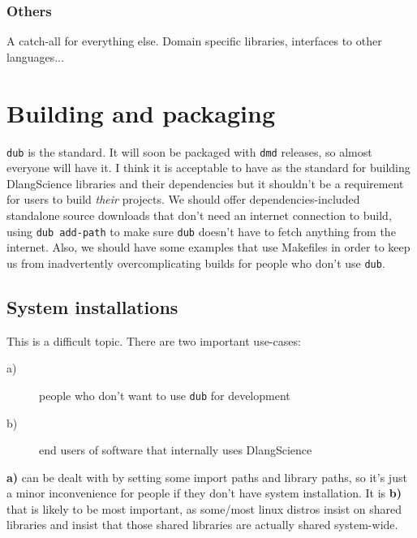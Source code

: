 \documentclass[10pt,a5paper,DIV=13]{scrartcl}
\begin{document}
\subsubsection*{Others}
A catch-all for everything else. Domain specific libraries, interfaces to other languages...

\section{Building and packaging}
\texttt{dub} is the standard. It will soon be packaged with \texttt{dmd} releases, so almost everyone will have it. I think it is acceptable to have as the standard for building DlangScience libraries and their dependencies but it shouldn't be a requirement for users to build \emph{their} projects. We should offer dependencies-included standalone source downloads that don't need an internet connection to build, using \texttt{dub add-path} to make sure \texttt{dub} doesn't have to fetch anything from the internet. Also, we should have some examples that use Makefiles in order to keep us from inadvertently overcomplicating builds for people who don't use \texttt{dub}.

\subsection{System installations}
This is a difficult topic. There are two important use-cases:
\begin{description}
    \item[a)] people who don't want to use \texttt{dub} for development
    \item[b)] end users of software that internally uses DlangScience
\end{description}
\textbf{a)} can be dealt with by setting some import paths and library paths, so it's just a minor inconvenience for people if they don't have system installation. It is \textbf{b)} that is likely to be most important, as some/most linux distros insist on shared libraries and insist that those shared libraries are actually shared system-wide.
\end{document}
